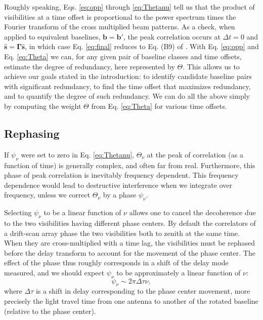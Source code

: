 \documentclass[twocolumn,apj,numberedappendix]{emulateapj}
\renewcommand\[{\begin{equation}}
\renewcommand\]{\end{equation}}
\begin{document}
Roughly speaking, Eqs. \eqref{eq:opp} through \eqref{eq:Thetanu} tell us that the product of visibilities at a time offset is proportional to the power spectrum times the Fourier
transform of the cross multiplied beam patterns. As a check, when applied to equivalent baselines,
$\boldsymbol{b}=\boldsymbol{b'}$, the peak correlation occurs at $\Delta t=0$ and $\hat{\boldsymbol{s}}=\boldsymbol{\Gamma}\hat{\boldsymbol{s}}$, in which case Eq. \eqref{eq:final} reduces to Eq. (B9) of \cite{paper32}. 
With Eq. \eqref{eq:opp} and Eq. \eqref{eq:Theta} we can, for any given pair of baseline classes and time offsets, estimate the degree of redundancy, here represented by $\Theta$. This allows us to achieve our goals stated in the introduction: to identify 
candidate baseline pairs with significant redundancy, to find the time offset that maximizes redundancy, and to quantify the degree of such redundancy. We can do all the above simply by computing the weight $\Theta$ from
Eq. \eqref{eq:Theta} for various time offsets.  



\subsection{Rephasing \label{sec:rephs}}
If $\psi_{\nu}$ were set to zero in  Eq. \eqref{eq:Thetanu}, $\Theta_{\nu}$ at the peak of correlation (as a function of time) is generally complex, and often far from real. Furthermore, this phase of peak correlation is inevitably frequency dependent. This frequency dependence would lead to destructive interference when we integrate over frequency, unless we correct $\Theta_{\nu}$ by a phase $\psi_\nu$. 

Selecting $\psi_\nu$ to be a linear function of $\nu$ allows one to cancel
the decoherence due to the two visibilities having different phase centers. By default the correlators of a drift-scan array phase the two visibilities both to zenith at the same time. When they are cross-multiplied with a time lag, the visibilities must be rephased before the delay transform to account for the movement of the phase center. The effect of the phase thus roughly corresponds in a shift of the delay mode measured, and we should expect $\psi_{\nu}$ to be approximately a linear function of $\nu$:
\[
\psi_{\nu}\sim 2\pi\Delta\tau\nu,
\]
where $\Delta\tau$ is a shift in delay corresponding to the phase center movement, more precisely the light travel time from one antenna to another of the rotated baseline (relative to the phase center).
\end{document}
